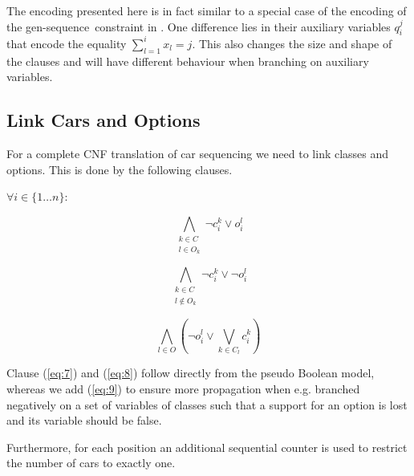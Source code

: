 \documentclass[]{llncs}
\def\constraint#1{\mbox{{\rm\sc #1} }}
\def\gseq{{\constraint{gen-sequence}}}
\begin{document}
The encoding presented here is in fact similar to a special case of the encoding of the \gseq constraint in
\cite{Bacchus07}. One difference lies in their auxiliary variables $q_i^j$ that encode the equality $\sum_{l=1}^i x_l =
j$.  This also changes the size and shape of the clauses and will have different behaviour when branching on auxiliary
variables. 

\subsection{Link Cars and Options}
\label{sub:link}

For a complete CNF translation of car sequencing we need to link classes and options. This is done by the following
clauses. 

$\forall i\in \{1\ldots n\}$: 

\begin{equation} \label{eq:7}
     \bigwedge_{\substack{k \in C \\ l \in O_k }} \neg c^k_{i} \vee o^l_{i}
\end{equation}

\begin{equation} \label{eq:8}
    \bigwedge_{\substack{k \in C \\ l \not \in O_k}} \neg c^k_{i} \vee \neg o^l_{i}
\end{equation}

\begin{equation} \label{eq:9}
    \bigwedge_{l\in O} \left(\neg o^l_{i} \vee \bigvee_{k \in C_l} c^k_{i}\right)
\end{equation}

Clause (\ref{eq:7}) and (\ref{eq:8}) follow directly from the pseudo Boolean model, whereas we add (\ref{eq:9}) to
ensure more propagation when e.g. branched negatively on a set of variables of classes such that a support for an
option is lost and its variable should be false.

Furthermore, for each position an additional sequential counter is used to restrict the number of cars to exactly one. 

%
\end{document}
